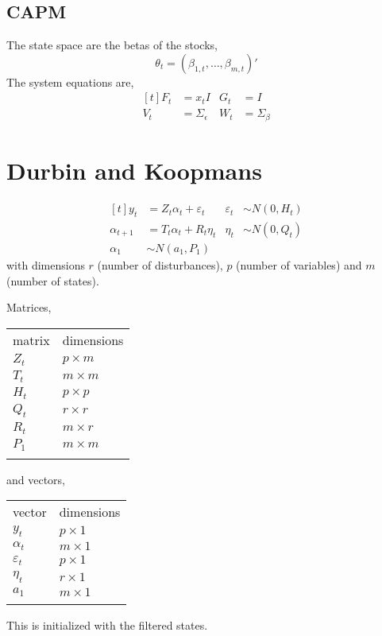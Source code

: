 \documentclass{article}\usepackage[]{graphicx}\usepackage[]{color}
\begin{document}
\subsection{CAPM}

The state space are the betas of the stocks,
\begin{equation}
  \theta_{t} = (\beta_{1,t}, \dots, \beta_{m,t})'
\end{equation}
The system equations are,
\begin{equation}
  \begin{aligned}[t]
    F_{t} &= x_{t} I & G_{t} &= I \\
    V_{t} &= \Sigma_{\epsilon} & W_{t} &= \Sigma_{\beta}
  \end{aligned}
\end{equation}



\section{Durbin and Koopmans}

\begin{equation*}
\begin{aligned}[t]
  y_t &= Z_t \alpha_{t} + \varepsilon_t & \varepsilon_t & \sim N(0, H_t) \\
  \alpha_{t+1} &= T_t \alpha_{t} + R_t \eta_t & \eta_t & \sim N(0, Q_t) \\
  \alpha_1 &\sim N(a_1, P_1)
\end{aligned}
\end{equation*}
with dimensions $r$ (number of disturbances), $p$ (number of variables)
and $m$ (number of states).

Matrices,
\begin{longtable}[c]{@{}ll@{}}
\hline\noalign{\medskip}
matrix & dimensions
\\\noalign{\medskip}
\hline\noalign{\medskip}
$Z_t$ & $p \times m$
\\\noalign{\medskip}
$T_t$ & $m \times m$
\\\noalign{\medskip}
$H_t$ & $p \times p$
\\\noalign{\medskip}
$Q_t$ & $r \times r$
\\\noalign{\medskip}
$R_t$ & $m \times r$
\\\noalign{\medskip}
$P_1$ & $m \times m$
\\\noalign{\medskip}
\hline
\end{longtable}
and vectors,
\begin{longtable}[c]{@{}ll@{}}
\hline\noalign{\medskip}
vector & dimensions
\\\noalign{\medskip}
\hline\noalign{\medskip}
$y_t$ & $p \times 1$
\\\noalign{\medskip}
$\alpha_t$ & $m \times 1$
\\\noalign{\medskip}
$\varepsilon_t$ & $p \times 1$
\\\noalign{\medskip}
$\eta_t$ & $r \times 1$
\\\noalign{\medskip}
$a_1$ & $m \times 1$
\\\noalign{\medskip}
\hline
\end{longtable}

This is initialized with the filtered states.



\printbibliography{}
\end{document}
